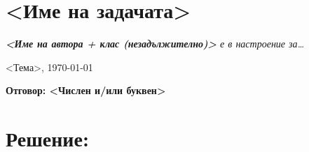 \documentclass{article}
\begin{document}

\section*{<Име на задачата>}

\begin{flushright}
\textit{\textbf{<Име на автора + клас (незадължително)>} е в настроение за\dots}

<Тема>, \today
\end{flushright}

\textbf{Отговор: <Числен и/или буквен>} %

\section*{Решение:}
\end{document}
